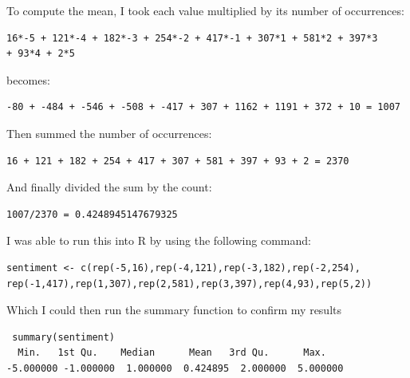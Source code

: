 \documentclass[10pt]{article}
\begin{document}
To compute the mean, I took each value multiplied by its number of occurrences:  
\begin{verbatim}
16*-5 + 121*-4 + 182*-3 + 254*-2 + 417*-1 + 307*1 + 581*2 + 397*3
+ 93*4 + 2*5
\end{verbatim}
becomes: 
\begin{verbatim}
-80 + -484 + -546 + -508 + -417 + 307 + 1162 + 1191 + 372 + 10 = 1007
\end{verbatim}
Then summed the number of occurrences: 
\begin{verbatim}
16 + 121 + 182 + 254 + 417 + 307 + 581 + 397 + 93 + 2 = 2370 
\end{verbatim}
And finally divided the sum by the count: 
\begin{verbatim}
1007/2370 = 0.4248945147679325 
\end{verbatim}

I was able to run this into R by using the following command: 
\begin{verbatim}
sentiment <- c(rep(-5,16),rep(-4,121),rep(-3,182),rep(-2,254),
rep(-1,417),rep(1,307),rep(2,581),rep(3,397),rep(4,93),rep(5,2)) 
\end{verbatim}

Which I could then run the summary function to confirm my results 
\begin{verbatim}
 summary(sentiment) 
  Min.   1st Qu.    Median      Mean   3rd Qu.      Max. 
-5.000000 -1.000000  1.000000  0.424895  2.000000  5.000000  
\end{verbatim}
\end{document}
